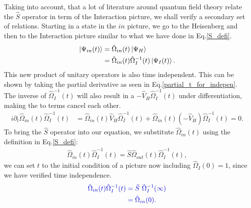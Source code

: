 \documentclass[12pt, titlepage]{article}
\begin{document}
Taking into account, that a lot of literature around quantum field theory relate the $ \hat{S} $ operator in term of the Interaction picture, we shall verify a secondary set of relations. Starting in a state in the $ in $ picture, we go to the Heisenberg and then to the Interaction picture similar to what we have done in Eq.\enskip\eqref{S_defi}.
\begin{equation}
\begin{split}
\ket{\Psi_{in}(t)}&=\hat{\Omega}_{in}(t)\ket{\Psi_{H}}
\\
&=\hat{\Omega}_{in}(t)\hat{\Omega}^{-1}_{I}(t)\ket{\Psi_{I}(t)}
.
\end{split}
\end{equation}
This new product of unitary operators is also time independent. This can be shown by taking the partial derivative as seen in Eq.\enskip\eqref{partial_t_for_indepen}. The inverse of $ \hat{\Omega}^{-1}_{I}(t) $ will also result in a $ -\hat{V}_{H}\hat{\Omega}^{-1}_{I}(t) $ under differentiation, making the to terms cancel each other.
\begin{equation}\label{product_2_t_indep}
\begin{split}
i\partial_{t}
\hat{\Omega}_{in}(t)\hat{\Omega}^{-1}_{I}(t)
&= \hat{\Omega}_{in}(t)\hat{V}_{H}\hat{\Omega}^{-1}_{I}(t)
+
\hat{\Omega}_{in}(t)(-\hat{V}_{H})\hat{\Omega}^{-1}_{I}(t)
=0
.
\end{split}
\end{equation}
To bring the $ \hat{S} $ operator into our equation, we substitute $ \hat{\Omega}_{in}(t) $ using the definition in Eq.\enskip\eqref{S_defi}:
\begin{equation}
\begin{split}
\hat{\Omega}_{in}(t)\hat{\Omega}^{-1}_{I}(t)
=\hat{S}\hat{\Omega}_{out}(t)\hat{\Omega}^{-1}_{I}(t)
,
\end{split}
\end{equation}
 we can set $t $ to the initial condition of a picture now including $ \hat{\Omega}_{I}(0) =1 $, since we have verified time independence.
\begin{equation}\label{second_set_S_relations}
\textcolor[RGB]{0,0,204}{
\begin{split}
\hat{\Omega}_{in}(t)\hat{\Omega}_{I}^{-1}(t)
&=\hat{S}\ \hat{\Omega}_{I}^{-1}(\infty)
\\
&=
	\hat{\Omega}_{in}(0)	
.
\end{split}
}
\end{equation}
\end{document}
